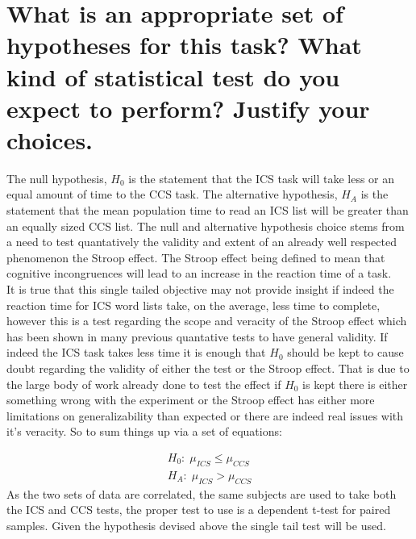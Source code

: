 \documentclass{article}
\begin{document}
\section{What is an appropriate set of hypotheses for this task? What kind of
statistical test do you expect to perform? Justify your choices.}
\label{sec:question2}
The null hypothesis, \(H_0\) is the statement that the ICS task will take less
or an equal amount of time to the CCS task. The alternative hypothesis, \(H_A\)
is the statement that the mean population time to read an ICS list will be
greater than an equally sized CCS list. The null and alternative hypothesis
choice stems from a need to test quantatively the validity and extent of an
already well respected phenomenon the Stroop effect. The Stroop effect being
defined to mean that cognitive incongruences will lead to an increase in the
reaction time of a task.\\ It is true that this single tailed objective may not
provide insight if indeed the reaction time for ICS word lists take, on the
average, less time to complete, however this is a test regarding the scope and
veracity of the Stroop effect which has been shown in many previous quantative
tests to have general validity. If indeed the ICS task takes less time it is
enough that \(H_0\) should be kept to cause doubt regarding the validity of
either the test or the Stroop effect.  That is due to the large body of work
already done to test the effect if \(H_0\) is kept there is either something
wrong with the experiment or the Stroop effect has either more limitations on
generalizability than expected or there are indeed real issues with it's
veracity. So to sum things up via a set of equations:

\begin{align}
H_0:\; \mu_{ICS} \le \mu_{CCS} \\
H_A:\; \mu_{ICS} > \mu_{CCS}
\end{align}
As the two sets of data are correlated, the same subjects are used to take both
the ICS and CCS tests, the proper test to use is a dependent t-test for paired
samples.  Given the hypothesis devised above the single tail test will be used.
\end{document}
